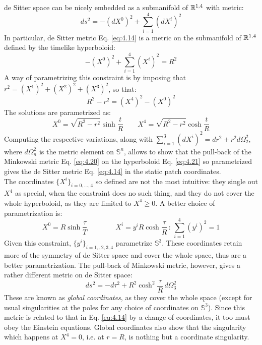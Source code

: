 de Sitter space can be nicely embedded as a submanifold of $ \mathbb{R}^{1,4} $ with metric:
\begin{equation}
  ds^2 = - (dX^0)^2 + \sum_{i = 1}^{4} (dX^i)^2
  \label{eq:4.20}
\end{equation}
In particular, de Sitter metric Eq. \ref{eq:4.14} is a metric on the submanifold of $ \mathbb{R}^{1,4} $ defined by the timelike hyperboloid:
\begin{equation}
  -(X^0)^2 + \sum_{i = 1}^{4} (X^i)^2 = R^2
  \label{eq:4.21}
\end{equation}
A way of parametrizing this constraint is by imposing that $ r^2 = (X^1)^2 + (X^2)^2 + (X^3)^2 $, so that:
\begin{equation*}
  R^2 - r^2 = (X^4)^2 - (X^0)^2
\end{equation*}
The solutions are parametrized as:
\begin{equation*}
  X^0 = \sqrt{R^2 - r^2} \sinh \frac{t}{R}
  \qquad
  X^4 = \sqrt{R^2 - r^2} \cosh \frac{t}{R}
\end{equation*}
Computing the respective variations, along with $ \sum_{i = 1}^{3} (dX^i)^2 = dr^2 + r^2 d\Omega_2^2 $, where $ d\Omega_n^2 $ is the metric element on $ \mathbb{S}^n $, allows to show that the pull-back of the Minkowski metric Eq. \ref{eq:4.20} on the hyperboloid Eq. \ref{eq:4.21} so parametrized gives the de Sitter metric Eq. \ref{eq:4.14} in the static patch coordinates.\\
The coordinates $ \{X^i\}_{i = 0,\dots,4} $ so defined are not the most intuitive: they single out $ X^4 $ as special, when the constraint does no such thing, and they do not cover the whole hyperboloid, as they are limited to $ X^4 \ge 0 $. A better choice of parametrization is:
\begin{equation*}
  X^0 = R \sinh \frac{\tau}{T}
  \qquad \qquad
  X^i = y^i R \cosh \frac{\tau}{R}
  \,:\,
  \sum_{i = 1}^{4} (y^i)^2 = 1
\end{equation*}
Given this constraint, $ \{y^i\}_{i = 1,,2,3,4} $ parametrize $ \mathbb{S}^3 $. These coordinates retain more of the symmetry of de Sitter space and cover the whole space, thus are a better parametrization. The pull-back of Minkowski metric, however, gives a rather different metric on de Sitter space:
\begin{equation}
  ds^2 = - d\tau^2 + R^2 \cosh^2 \frac{\tau}{R}\, d\Omega_3^2
  \label{eq:4.22}
\end{equation}
These are known as \textit{global coordinates}, as they cover the whole space (except for usual singularities at the poles for any choice of coordinates on $ \mathbb{S}^3 $). Since this metric is related to that in Eq. \ref{eq:4.14} by a change of coordinates, it too must obey the Einstein equations. Global coordinates also show that the singularity which happens at $ X^4 = 0 $, i.e. at $ r = R $, is nothing but a coordinate singularity.

